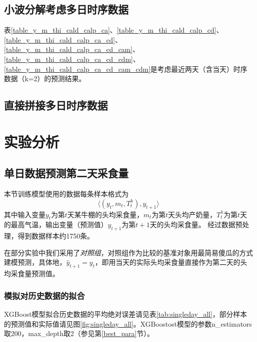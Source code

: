 %
%
\subsection{小波分解考虑多日时序数据}
表\ref{table_y_m_thi_cald_calp_ca}、\ref{table_y_m_thi_cald_calp_cd}、 \ref{table_y_m_thi_cald_calp_ca_cd}、 \ref{table_y_m_thi_cald_calp_ca_cd_cam}、\ref{table_y_m_thi_cald_calp_ca_cd_cdm}、\ref{table_y_m_thi_cald_calp_ca_cd_cam_cdm}是考虑最近两天（含当天）时序数据（k=2）的预测结果。






\subsection{直接拼接多日时序数据}












\section{实验分析}
\label{evaluation}

\subsection{单日数据预测第二天采食量}

本节训练模型使用的数据每条样本格式为
\begin{equation}
\label{sample}
	\langle (y_t, m_t, T^h_t), y_{t+1} \rangle
\end{equation}
	其中输入变量$y_t$为第$t$天某牛棚的头均采食量，$m_t$为第$t$天头均产奶量，$T_t^h$为第$t$天的最高气温，输出变量（预测值）$y_{t+1}$为第$t+1$天的头均采食量。
经过数据预处理，得到数据样本约1750条。
	
在部分实验中我们采用了\emph{对照组}，对照组作为比较的基准对象用最简易傻瓜的方式建模预测，具体地，$\hat y_{t+1} = y_t$，即用当天的实际头均采食量直接作为第二天的头均采食量预测值。

	
\subsubsection{模拟对历史数据的拟合}

XGBoost模型拟合历史数据的平均绝对误差请见表\ref{tab:singleday_all}，部分样本的预测值和实际值请见图\ref{fig:singleday_all}。XGBoostost模型的参数n\_estimators取200，max\_depth取2（参见第\ref{best_para}节）。

